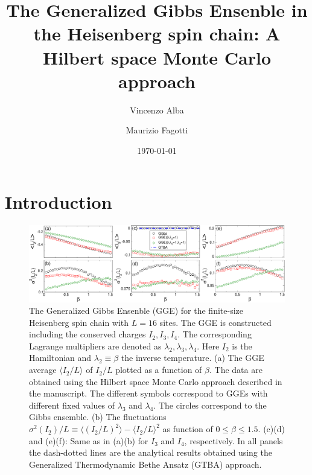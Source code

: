 \documentclass[twocolumn,superscriptaddress,prb,10pt]{revtex4-1}
\begin{document}
\title{The Generalized Gibbs Ensenble in the Heisenberg spin chain: A Hilbert space Monte Carlo 
approach} 

\author{Vincenzo Alba}

\author{Maurizio Fagotti}

\date{\today}




\begin{abstract} 


\end{abstract}


\maketitle


\section{Introduction}

\begin{figure}[t]
\includegraphics*[width=0.93\linewidth]{./draft_figs/fig1}
\caption{The Generalized Gibbs Ensenble (GGE) for the finite-size Heisenberg spin 
 chain with $L=16$ sites. The GGE is constructed including the conserved charges  
 $I_2, I_3,I_4$. The corresponding Lagrange multipliers are denoted  as $\lambda_2,
 \lambda_3,\lambda_4$. Here $I_2$ is the Hamiltonian and $\lambda_2\equiv\beta$ the 
 inverse temperature. (a) The GGE average $\langle I_2/L\rangle$ of $I_2/L$ plotted 
 as a function of $\beta$. The data are obtained using the Hilbert space Monte Carlo 
 approach described in the manuscript. The different symbols correspond to GGEs with 
 different fixed  values of $\lambda_3$ and $\lambda_4$. The circles correspond to the 
 Gibbs ensemble. (b) The fluctuations $\sigma^2(I_2)/L\equiv \langle (I_2/L)^2\rangle-
 \langle I_2/L\rangle^2$ as function of $0\le\beta\le 1.5$. (c)(d) and (e)(f): Same 
 as in (a)(b) for $I_3$ and $I_4$, respectively. In all panels the dash-dotted lines  
 are the analytical results obtained using the Generalized Thermodynamic Bethe 
 Ansatz (GTBA) approach.
}
\label{fig1}
\end{figure}
\end{document}
